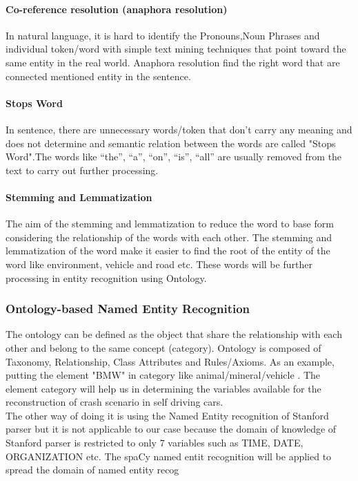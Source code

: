 \paragraph{Co-reference resolution (anaphora resolution)}
In natural language, it is hard to identify the Pronouns,Noun Phrases and individual token/word with simple text mining techniques that point toward the same entity in the real world. Anaphora resolution find the right word that are connected mentioned entity in the sentence. 

\paragraph{Stops Word}
In sentence, there are unnecessary words/token that don't carry any meaning and does not determine and semantic relation between the words are called "Stops Word".The words like “the”, “a”, “on”, “is”, “all” are usually removed from the text to carry out further processing.  

\paragraph{Stemming and Lemmatization}
The aim of the stemming and lemmatization to reduce the word to base form considering the relationship of the words with each other. The stemming and lemmatization of the word make it easier to find the root of the entity of the word like environment, vehicle and road etc. These words will be further processing in entity recognition using Ontology.  
\subsubsection{Ontology-based Named Entity Recognition}
The ontology can be defined as the object that share the relationship with each other and belong to the same concept (category). Ontology is composed of Taxonomy, Relationship, Class Attributes and Rules/Axioms. As an example, putting the element "BMW" in category like animal/mineral/vehicle \cite{cucerzan2007large}. The element category will help us in determining the variables available for the reconstruction of crash scenario in self driving cars. \\

The other way of doing it is using the Named Entity recognition of Stanford parser but it is not applicable to our case because the domain of knowledge of Stanford parser is restricted to only 7 variables such as TIME, DATE, ORGANIZATION etc. The spaCy named entit  recognition will be applied to spread the domain of named entity recog\\

